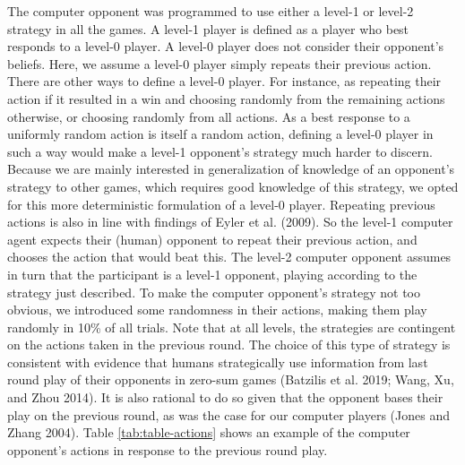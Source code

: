 \documentclass[smallextended]{svjour3}       %
\begin{document}
The computer opponent was programmed to use either a level-1 or level-2
strategy in all the games. A level-1 player is defined as a player who
best responds to a level-0 player. A level-0 player does not consider
their opponent's beliefs. Here, we assume a level-0 player simply
repeats their previous action. There are other ways to define a level-0
player. For instance, as repeating their action if it resulted in a win
and choosing randomly from the remaining actions otherwise, or choosing
randomly from all actions. As a best response to a uniformly random
action is itself a random action, defining a level-0 player in such a
way would make a level-1 opponent's strategy much harder to discern.
Because we are mainly interested in generalization of knowledge of an
opponent's strategy to other games, which requires good knowledge of
this strategy, we opted for this more deterministic formulation of a
level-0 player. Repeating previous actions is also in line with findings
of Eyler et al. (2009). So the level-1 computer agent expects their
(human) opponent to repeat their previous action, and chooses the action
that would beat this. The level-2 computer opponent assumes in turn that
the participant is a level-1 opponent, playing according to the strategy
just described. To make the computer opponent's strategy not too
obvious, we introduced some randomness in their actions, making them
play randomly in 10\% of all trials. Note that at all levels, the
strategies are contingent on the actions taken in the previous round.
The choice of this type of strategy is consistent with evidence that
humans strategically use information from last round play of their
opponents in zero-sum games (Batzilis et al. 2019; Wang, Xu, and Zhou
2014). It is also rational to do so given that the opponent bases their
play on the previous round, as was the case for our computer players
(Jones and Zhang 2004). Table \ref{tab:table-actions} shows an example
of the computer opponent's actions in response to the previous round
play.

\begin{table}

\caption{\label{tab:table-actions}Example of how a level-1 and level-2 computer agent plays in response to actions taken in the previous round}
\centering
{}
\end{table}
\end{document}
